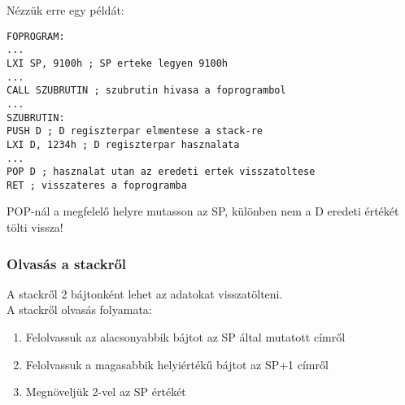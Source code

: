 Nézzük erre egy példát:
\begin{lstlisting}[frame=single]
FOPROGRAM:
...
LXI SP, 9100h ; SP erteke legyen 9100h
...
CALL SZUBRUTIN ; szubrutin hivasa a foprogrambol
...
SZUBRUTIN:
PUSH D ; D regiszterpar elmentese a stack-re
LXI D, 1234h ; D regiszterpar hasznalata
...
POP D ; hasznalat utan az eredeti ertek visszatoltese
RET ; visszateres a foprogramba
\end{lstlisting}
\colorbox{orange!30}{POP-nál a megfelelő helyre mutasson az SP, különben nem a D eredeti értékét tölti vissza!}

\subsubsection{Olvasás a stackről}
A stackről 2 bájtonként lehet az adatokat visszatölteni. \\
A stackről olvasás folyamata:
\begin{enumerate}
  \item Felolvassuk az alacsonyabbik bájtot az SP által mutatott címről
  \item Felolvassuk a magasabbik helyiértékű bájtot az SP+1 címről
  \item Megnöveljük 2-vel az SP értékét
\end{enumerate}

